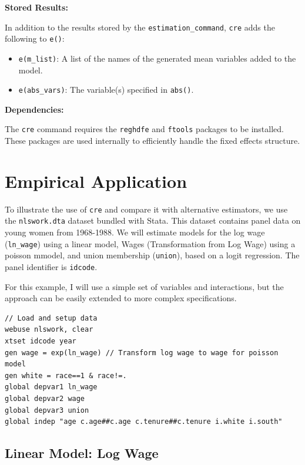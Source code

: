 \documentclass[bib]{statapress}
\providecommand{\tightlist}{%
  \setlength{\itemsep}{0pt}\setlength{\parskip}{0pt}}\usepackage{longtable,booktabs,array}
\begin{document}
\textbf{Stored Results:}

In addition to the results stored by the \texttt{estimation\_command},
\texttt{cre} adds the following to \texttt{e()}:

\begin{itemize}
\tightlist
\item
  \texttt{e(m\_list)}: A list of the names of the generated mean
  variables added to the model.
\item
  \texttt{e(abs\_vars)}: The variable(s) specified in \texttt{abs()}.
\end{itemize}

\textbf{Dependencies:}

The \texttt{cre} command requires the \texttt{reghdfe}
\citep{correia_2016} and \texttt{ftools} packages to be installed. These
packages are used internally to efficiently handle the fixed effects
structure.

\section{Empirical Application}\label{sec-4}

To illustrate the use of \texttt{cre} and compare it with alternative
estimators, we use the \texttt{nlswork.dta} dataset bundled with Stata.
This dataset contains panel data on young women from 1968-1988. We will
estimate models for the log wage (\texttt{ln\_wage}) using a linear
model, Wages (Transformation from Log Wage) using a poisson mmodel, and
union membership (\texttt{union}), based on a logit regression. The
panel identifier is \texttt{idcode}.

For this example, I will use a simple set of variables and interactions,
but the approach can be easily extended to more complex specifications.

\begin{verbatim}
// Load and setup data
webuse nlswork, clear
xtset idcode year
gen wage = exp(ln_wage) // Transform log wage to wage for poisson model
gen white = race==1 & race!=.
global depvar1 ln_wage
global depvar2 wage
global depvar3 union
global indep "age c.age##c.age c.tenure##c.tenure i.white i.south"
\end{verbatim}

\subsection{Linear Model: Log Wage}\label{linear-model-log-wage}
\end{document}
